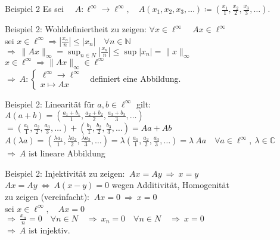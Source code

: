 \documentclass[AERbeamer%
,optBeamerClassicFormat%
,optLeftEquations   %
]{AERlatex}
\begin{document}
%
    \begin{frame}{Beispiel 2}
        \setlength{\baselineskip}{1.6\baselineskip}
        Es sei $\quad A: \ell^{\infty} \rightarrow \ell^{\infty}, \quad A\left(x_1, x_2, x_3, \ldots\right)\coloneqq\left(\frac{x_1}{1}, \frac{x_2}{2}, \frac{x_3}{3}, \ldots\right)$.
    \end{frame}
%
    \begin{frame}{Beispiel 2: Wohldefiniertheit}
        \setlength{\baselineskip}{1.6\baselineskip}
        zu zeigen: $\forall x \in \ell^{\infty} \quad A x \in \ell^{\infty}$ \\
        sei $x \in \ell^{\infty} \Rightarrow\left|\frac{x_n}{n}\right| \leq\left|x_n\right| \quad \forall n \in \mathbb{N}$ \\
        $\Rightarrow ~ \|A x\|_{\infty}=\sup _{n \in N}\left|\frac{x_n}{n}\right| \leq \sup \left|x_n\right|=\|x\|_{\infty}$ \\
        $x \in \ell^{\infty} \Rightarrow\|A x\|_{\infty} \in \ell^{\infty}$ \\
        \vspace{1em}
        $\Rightarrow ~ A:\left\{\begin{array}{l}
                                    \ell^{\infty} \rightarrow \ell^{\infty} \\ x \mapsto A x
        \end{array} \right.~$ definiert eine Abbildung.
    \end{frame}
%
    \begin{frame}{Beispiel 2: Linearität}
        \setlength{\baselineskip}{1.6\baselineskip}
        für $a, b \in \ell^{\infty}$ gilt: \\
        $A(a+b)=\left(\frac{a_1+b_1}{1}, \frac{a_2+b_2}{2}, \frac{a_3+b_3}{3}, \ldots\right)$ \\ \pause
        $=\left(\frac{a_1}{1}, \frac{a_2}{2}, \frac{a_3}{3}, \ldots\right)+\left(\frac{b_1}{1}, \frac{b_2}{2}, \frac{b_3}{3}, \ldots\right)=A a+A b$ \\ \pause
        $A(\lambda a)=\left(\frac{\lambda a_1}{1}, \frac{\lambda a_2}{2}, \frac{\lambda a_3}{3}, \ldots\right)=\lambda\left(\frac{a_1}{1}, \frac{a_2}{2}, \frac{a_3}{3}, \ldots\right)=\lambda ~ A a \quad \forall a \in \ell^{\infty}, ~\lambda \in \mathbb{C}$ \\ \pause
        $\Rightarrow ~ A$  ist lineare Abbildung
    \end{frame}
%
    \begin{frame}{Beispiel 2: Injektivität}
        \setlength{\baselineskip}{1.6\baselineskip}
        zu zeigen: $~ A x=A y ~ \Rightarrow ~ x=y$ \\ \pause
        $A x=A y ~ \Leftrightarrow ~ A(x-y)=0$ wegen Additivität, Homogenität \\ \pause
        zu zeigen (vereinfacht): $~ A x=0 ~ \Rightarrow ~ x=0$ \\ \pause
        sei $x \in \ell^{\infty}, \quad A x=0$ \\ \pause
        $\Rightarrow ~ \frac{x_n}{n}=0 \quad \forall n \in N \quad \Rightarrow ~ x_n=0 \quad \forall n \in N \quad \Rightarrow ~ x=0$ \\ \pause
        $\Rightarrow ~ A$ ist injektiv.
    \end{frame}
\end{document}
